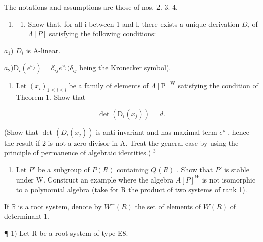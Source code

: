 The notations and assumptions are those of nos. 2. 3. 4.

\begin{enumerate}
\def\labelenumi{\arabic{enumi})}
\tightlist
\item
  \begin{enumerate}
  \def\labelenumii{\alph{enumii})}
  \tightlist
  \item
    Show that, for all i between 1 and l, there exists a unique derivation \(D_{i}\) of \(\Lambda[P]\) satisfying the following conditions:
  \end{enumerate}
\end{enumerate}

\(a_{1})\) \(D_{i}\) is A-linear.

\(a_{2})\mathrm{D}_{i}(e^{\omega_{j}}) = \delta_{ij}e^{\omega_{j}}(\delta_{ij}\) being the Kronecker symbol).

\begin{enumerate}
\def\labelenumi{\alph{enumi})}
\setcounter{enumi}{1}
\tightlist
\item
  Let \((x_{i})_{1\leqslant i\leqslant l}\) be a family of elements of \(\Lambda [\mathrm{P}]^{\mathrm{W}}\) satisfying the condition of Theorem 1. Show that
\end{enumerate}

\[
\det \left(\mathrm{D} _ {i} (x _ {j})\right) = d.
\]

(Show that \(\det(D_{i}(x_{j}))\) is anti-invariant and has maximal term \(e^{\rho}\) , hence the result if 2 is not a zero divisor in A. Treat the general case by using the principle of permanence of algebraic identities.) \(^{3}\)

\begin{enumerate}
\def\labelenumi{\arabic{enumi})}
\setcounter{enumi}{1}
\tightlist
\item
  Let \(P'\) be a subgroup of \(P(R)\) containing \(Q(R)\) . Show that \(P'\) is stable under W. Construct an example where the algebra \(A[P]^{W}\) is not isomorphic to a polynomial algebra (take for R the product of two systems of rank 1).
\end{enumerate}


If \(\mathbb{R}\) is a root system, denote by \(W^{+}(R)\) the set of elements of \(W(R)\) of determinant 1.

¶ 1) Let R be a root system of type E8.


